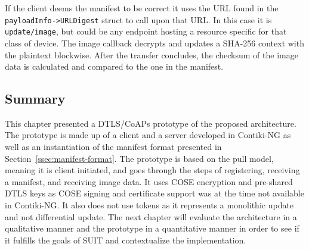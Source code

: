 \documentclass[0-thesis.tex]{subfiles}
\begin{document}
If the client deems the manifest to be correct it uses the URL found in the
\texttt{payloadInfo->URLDigest} struct to call upon that URL. In this case it is
\texttt{update/image}, but could be any endpoint hosting a resource specific for that
class of device. The image callback decrypts and updates a SHA-256 context with the
plaintext blockwise. After the transfer concludes, the checksum of the image data is
calculated and compared to the one in the manifest.


\subsection{Summary}
\label{ssec:implementation-summary}
This chapter presented a DTLS/CoAPs prototype of the proposed architecture. The prototype
is made up of a client and a server developed in Contiki-NG as well as an instantiation of
the manifest format presented in Section~\ref{ssec:manifest-format}. The prototype is
based on the pull model, meaning it is client initiated, and goes through the steps of
registering, receiving a manifest, and receiving image data. It uses COSE encryption and
pre-shared DTLS keys as COSE signing and certificate support was at the time not available
in Contiki-NG. It also does not use tokens as it represents a monolithic update and not
differential update. The next chapter will evaluate the architecture in a qualitative
manner and the prototype in a quantitative manner in order to see if it fulfills the goals
of SUIT and contextualize the implementation.
\end{document}
